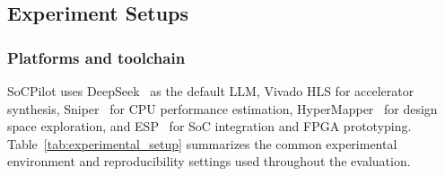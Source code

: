 \subsection{Experiment Setups}
\subsubsection{Platforms and toolchain}

SoCPilot uses DeepSeek~\cite{DeepSeek} as the default LLM, Vivado HLS for accelerator synthesis, Sniper~\cite{sniper} for CPU performance estimation, HyperMapper~\cite{9124618} for design space exploration, and ESP~\cite{mantovani2020agile} for SoC integration and FPGA prototyping. Table~\ref{tab:experimental_setup} summarizes the common experimental environment and reproducibility settings used throughout the evaluation.

